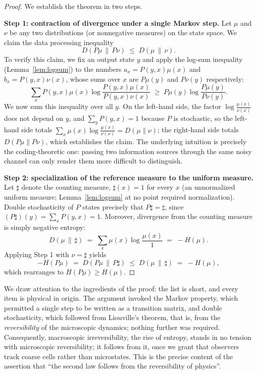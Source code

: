 \documentclass[10pt]{article}
\theoremstyle{definition}
\theoremstyle{remark}
\begin{document}
\begin{proof}
We establish the theorem in two steps.

\textbf{Step 1: contraction of divergence under a single Markov step.} Let $\mu$ and $\nu$ be any two distributions (or nonnegative measures) on the state space. We claim the data processing inequality
\[
D(P\mu \,\|\, P\nu) \;\le\; D(\mu \,\|\, \nu).
\]
To verify this claim, we fix an output state $y$ and apply the log-sum inequality (Lemma~\ref{lem:logsum}) to the numbers $a_x = P(y,x)\mu(x)$ and $b_x = P(y,x)\nu(x)$, whose sums over $x$ are $P\mu(y)$ and $P\nu(y)$ respectively:
\[
\sum_x P(y,x)\mu(x) \log \frac{P(y,x)\mu(x)}{P(y,x)\nu(x)} \;\ge\; P\mu(y) \log \frac{P\mu(y)}{P\nu(y)}.
\]
We now sum this inequality over all $y$. On the left-hand side, the factor $\log\frac{\mu(x)}{\nu(x)}$ does not depend on $y$, and $\sum_y P(y,x) = 1$ because $P$ is stochastic, so the left-hand side totals $\sum_x \mu(x)\log\frac{\mu(x)}{\nu(x)} = D(\mu\|\nu)$; the right-hand side totals $D(P\mu \| P\nu)$, which establishes the claim. The underlying intuition is precisely the coding-theoretic one: passing two information sources through the same noisy channel can only render them more difficult to distinguish.

\textbf{Step 2: specialization of the reference measure to the uniform measure.} Let $\sharp$ denote the counting measure, $\sharp(x) = 1$ for every $x$ (an unnormalized uniform measure; Lemma~\ref{lem:logsum} at no point required normalization). Double stochasticity of $P$ states precisely that $P\sharp = \sharp$, since $(P\sharp)(y) = \sum_x P(y,x) = 1$. Moreover, divergence from the counting measure is simply negative entropy:
\[
D(\mu \,\|\, \sharp) \;=\; \sum_x \mu(x) \log \frac{\mu(x)}{1} \;=\; -H(\mu).
\]
Applying Step 1 with $\nu = \sharp$ yields
\[
-H(P\mu) \;=\; D(P\mu \,\|\, P \sharp) \;\le\; D(\mu \,\|\, \sharp) \;=\; -H(\mu),
\]
which rearranges to $H(P\mu) \ge H(\mu)$.
\end{proof}

We draw attention to the ingredients of the proof: the list is short, and every item is physical in origin. The argument invoked the Markov property, which permitted a single step to be written as a transition matrix, and double stochasticity, which followed from Liouville's theorem, that is, from the \emph{reversibility} of the microscopic dynamics; nothing further was required. Consequently, macroscopic irreversibility, the rise of entropy, stands in no tension with microscopic reversibility; it follows from it, once we grant that observers track coarse cells rather than microstates. This is the precise content of the assertion that ``the second law follows from the reversibility of physics''.
\end{document}
